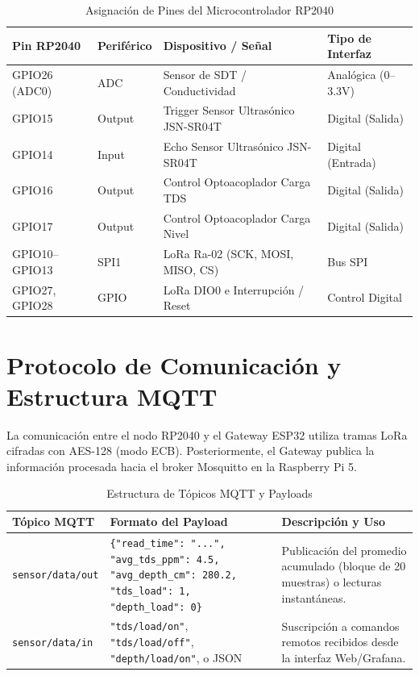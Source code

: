 \documentclass[12pt,letterpaper]{article}     %
\begin{document}
\begin{table}[H]
\centering
\caption{Asignación de Pines del Microcontrolador RP2040}
\vspace{2mm}
\begin{tabular}{llll}
\toprule
\textbf{Pin RP2040} & \textbf{Periférico} & \textbf{Dispositivo / Señal} & \textbf{Tipo de Interfaz} \\ \midrule
GPIO26 (ADC0) & ADC & Sensor de SDT / Conductividad & Analógica (0--3.3V) \\
GPIO15 & Output & Trigger Sensor Ultrasónico JSN-SR04T & Digital (Salida) \\
GPIO14 & Input & Echo Sensor Ultrasónico JSN-SR04T & Digital (Entrada) \\
GPIO16 & Output & Control Optoacoplador Carga TDS & Digital (Salida) \\
GPIO17 & Output & Control Optoacoplador Carga Nivel & Digital (Salida) \\
GPIO10--GPIO13 & SPI1 & LoRa Ra-02 (SCK, MOSI, MISO, CS) & Bus SPI \\
GPIO27, GPIO28 & GPIO & LoRa DIO0 e Interrupción / Reset & Control Digital \\ \bottomrule
\end{tabular}
\end{table}

\section{Protocolo de Comunicación y Estructura MQTT}
La comunicación entre el nodo RP2040 y el Gateway ESP32 utiliza tramas LoRa cifradas con AES-128 (modo ECB). Posteriormente, el Gateway publica la información procesada hacia el broker Mosquitto en la Raspberry Pi 5.

\begin{table}[H]
\centering
\caption{Estructura de Tópicos MQTT y Payloads}
\vspace{2mm}
\begin{tabular}{lp{5.5cm}p{5.5cm}}
\toprule
\textbf{Tópico MQTT} & \textbf{Formato del Payload} & \textbf{Descripción y Uso} \\ \midrule
\texttt{sensor/data/out} & \texttt{\{"read\_time": "...", "avg\_tds\_ppm": 4.5, "avg\_depth\_cm": 280.2, "tds\_load": 1, "depth\_load": 0\}} & Publicación del promedio acumulado (bloque de 20 muestras) o lecturas instantáneas. \\ \midrule
\texttt{sensor/data/in} & \texttt{"tds/load/on"}, \texttt{"tds/load/off"}, \texttt{"depth/load/on"}, o JSON & Suscripción a comandos remotos recibidos desde la interfaz Web/Grafana. \\ \bottomrule
\end{tabular}
\end{table}
\end{document}
